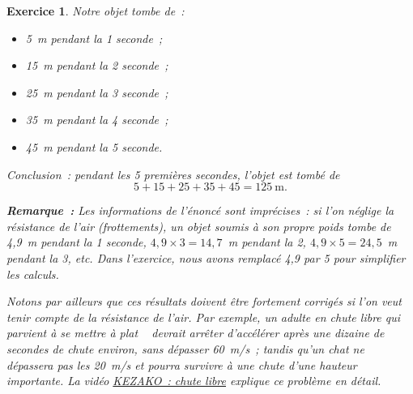 \documentclass[10pt]{article}
\newtheorem{exo}{Exercice}
\begin{document}
\begin{exo}

Notre objet tombe de~:

\begin{itemize}
\item[\textbullet] 5~m pendant la 1 seconde~;
\item[\textbullet] 15~m pendant la 2 seconde~;
\item[\textbullet] 25~m pendant la 3 seconde~;
\item[\textbullet] 35~m pendant la 4 seconde~;
\item[\textbullet] 45~m pendant la 5 seconde.
\end{itemize}

\medskip

Conclusion~: pendant les 5 premières secondes, l'objet est tombé de
\[5+15+25+35+45=125~\text{m}.\]

\medskip

\textbf{Remarque~:} Les informations de l'énoncé sont imprécises~: si l'on néglige la résistance de l'air (frottements), un objet soumis à son propre poids tombe de 4,9~m pendant la 1 seconde, $4,9\times 3=14,7$~m pendant la 2, $4,9\times 5=24,5$~m pendant la 3, etc. Dans l'exercice, nous avons remplacé 4,9 par 5 pour simplifier les calculs.

\medskip

Notons par ailleurs que ces résultats doivent être fortement corrigés si l'on veut tenir compte de la résistance de l'air. Par exemple, un adulte en chute libre qui parvient à se mettre \og à plat \fg~{} devrait arrêter d'accélérer après une dizaine de secondes de chute environ, sans dépasser 60~m/s~; tandis qu'un chat ne dépassera pas les 20~m/s et pourra survivre à une chute d'une hauteur importante. La vidéo \href{https://www.youtube.com/watch?v=RFbmabdbBC0}{KEZAKO~: chute libre} explique ce problème en détail.
\end{exo}

\newpage
\end{document}
